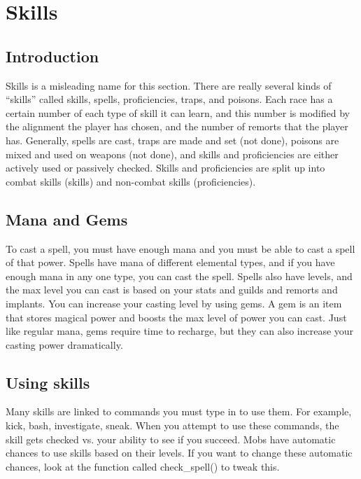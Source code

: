 \chapter{Skills}


\section{Introduction}

Skills is a misleading name for this section. There are really
several kinds of ``skills'' called skills, spells, proficiencies,
traps, and poisons. Each race has a certain number of each type of
skill it can learn, and this number is modified by the alignment the
player has chosen, and the number of remorts that the player
has. Generally, spells are cast, traps are made and set (not done), poisons are
mixed and used on weapons (not done), and skills and proficiencies are
either actively used or passively checked. Skills and proficiencies
are split up into combat skills (skills) and non-combat skills
(proficiencies). 

\section{Mana  and Gems}

To cast a spell, you must have enough mana and you must be able to
cast a spell of that power. Spells have mana of different elemental
types, and if you have enough mana in any one type, you can cast the
spell. Spells also have levels, and the max level you can cast is
based on your stats and guilds and remorts and implants. You can
increase your casting level by using gems. A gem is an item that
stores magical power and boosts the max level of power you can
cast. Just like regular mana, gems require time to recharge, but they
can also increase your casting power dramatically. 

\section{Using skills}

Many skills are linked to commands you must type in to use them. For
example, kick, bash, investigate, sneak. When you attempt to use these
commands, the skill gets checked vs. your ability to see if you
succeed. Mobs have automatic chances to use skills based on their
levels. If you want to change these automatic chances, look at the
function called check\_spell() to tweak this.


